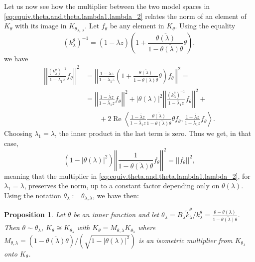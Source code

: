 \documentclass[12pt]{elsarticle}
\numberwithin{equation}{section}
\theoremstyle{plain}
\newtheorem{prop}[thm]{Proposition}
\newcommand{\ol}[1]{\ensuremath{\overline{#1}}}
\renewcommand{\Re}{\ensuremath{\operatorname{Re}}}
\newcommand{\kktil}{\ensuremath{\tilde k^\theta_\lambda}}
\newcommand{\kk}{\ensuremath{k^\theta_\lambda}}
\begin{document}
Let us now see how the multiplier between the two model spaces in \eqref{eq:equiv.theta.and.theta.lambda1.lambda_2} relates the norm of an element of $K_\theta$ with its image in $K_{\theta_{\lambda_1,\lambda}}$.
Let $f_\theta$ be any element in $K_\theta$.
Using the equality
\begin{equation*}
\label{eq:fact_inverse_kk}
(\kk)^{-1}= (1- \ol\lambda z) \left(1 + \frac{\ol{\theta (\lambda)}}{1 - \ol{\theta(\lambda)}\theta} \theta \right),
\end{equation*}
we have 
\begin{align*}
\left|\left| 
	\frac{(\kk)^{-1}}{1- \ol\lambda_1 z} f_\theta 
\right|\right|^2
& = 
\left|\left|
	\frac{1- \ol\lambda z}{1- \ol\lambda_1 z} 
	\left( 
		1 + \frac{\ol{\theta (\lambda)}}{1 - \ol{\theta(\lambda)}\theta} \theta 
	\right)
	f_\theta  
\right|\right|^2 
=  \\
& = 
\left|\left| 
	\frac{1- \ol\lambda z}{1- \ol\lambda_1 z} f_\theta 
\right|\right|^2
+
|\theta(\lambda)|^2 
\left|\left| 
	\frac{(\kk)^{-1}}{1- \ol\lambda_1 z} f_\theta 
\right|\right|^2
+  \\
& \qquad +
2 \Re \left\langle 
	\frac{1- \ol\lambda z}{1- \ol\lambda_1 z}
	\frac{\ol{\theta (\lambda)}}{1 - \ol{\theta(\lambda)}\theta} 
	\theta f_\theta 
	, 
	\frac{1- \ol\lambda z}{1- \ol\lambda_1 z} f_\theta \right\rangle. 
\end{align*}
Choosing $\lambda_1=\lambda$, the inner product in the last term is zero.
Thus we get, in that case,
\begin{equation*}
( 1-|\theta(\lambda)|^2 ) \left|\left| \frac{1}{1 - \ol{\theta(\lambda)} \theta }  f_\theta \right|\right|^2  =  \left|\left| f_\theta \right|\right|^2,
\end{equation*}
meaning that the multiplier in \eqref{eq:equiv.theta.and.theta.lambda1.lambda_2}, for $\lambda_1=\lambda$, preserves the norm, up to a constant factor depending only on $\theta(\lambda)$.
Using the notation $\theta_\lambda := \theta_{\lambda,\lambda}$, we have then:


\begin{prop}
\label{prop:Crofoot_multiplier}
Let $\theta$ be an inner function and let
$\theta_\lambda = B_\lambda \kktil / \kk = \frac{\theta - \theta(\lambda)}{1 - \ol{\theta(\lambda)} \theta}$.
Then $\theta \sim \theta_\lambda$, $K_\theta \cong K_{\theta_\lambda}$ with 
$K_\theta =  M_{\theta,\lambda} K_{\theta_\lambda}$ where 
$M_{\theta,\lambda} = (1-\ol{\theta(\lambda)}\theta) / (\sqrt{1-|\theta(\lambda)|^2})$
is an isometric multiplier from $K_{\theta_\lambda}$ onto $K_\theta$.
\end{prop}
\end{document}
